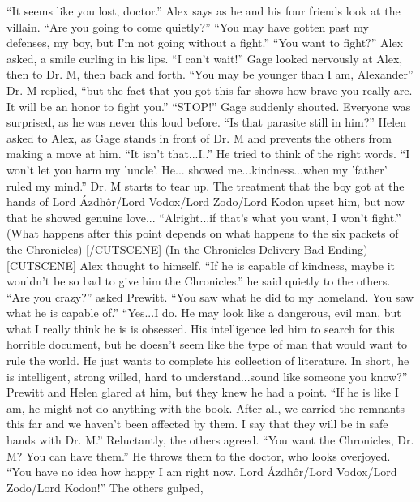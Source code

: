\documentclass{gd-document}
\begin{document}
\begin{enumerate}
\begin{enumerate}
      [CUTSCENE] “It seems like you lost, doctor.” Alex says as he and
      his four friends look at the villain. “Are you going to come
      quietly?” “You may have gotten past my defenses, my boy, but I'm
      not going without a fight.” “You want to fight?” Alex asked, a
      smile curling in his lips. “I can't wait!” Gage looked nervously
      at Alex, then to Dr. M, then back and forth. “You may be younger
      than I am, Alexander” Dr. M replied,  “but the fact that you got
      this far shows how brave you really are. It will be an honor to
      fight you.” “STOP!” Gage suddenly shouted. Everyone was
      surprised, as he was never this loud before. “Is that parasite
      still in him?” Helen asked to Alex, as Gage stands in front of
      Dr. M and prevents the others from making a move at him. “It
      isn't that...I..” He tried to think of the right words. “I won't
      let you harm my 'uncle'. He... showed me...kindness...when my
      'father' ruled my mind.” Dr. M starts to tear up. The treatment
      that the boy got at the hands of Lord Ázdhôr/Lord Vodox/Lord
      Zodo/Lord Kodon upset him, but now that he showed genuine
      love... “Alright...if that's what you want, I won't fight.”
      (What happens after this point depends on what happens to the
      six packets of the Chronicles) [/CUTSCENE] (In the Chronicles
      Delivery Bad Ending) [CUTSCENE] Alex thought to himself. “If he
      is capable of kindness, maybe it wouldn't be so bad to give him
      the Chronicles.” he said quietly to the others. “Are you crazy?”
      asked Prewitt. “You saw what he did to my homeland. You saw what
      he is capable of.” “Yes...I do. He may look like a dangerous,
      evil man, but what I really think he is is obsessed. His
      intelligence led him to search for this horrible document, but
      he doesn't seem like the type of man that would want to rule the
      world. He just wants to complete his collection of
      literature. In short, he is intelligent, strong willed, hard to
      understand...sound like someone you know?” Prewitt and Helen
      glared at him, but they knew he had a point. “If he is like I
      am, he might not do anything with the book. After all, we
      carried the remnants this far and we haven't been affected by
      them. I say that they will be in safe hands with Dr. M.”
      Reluctantly, the others agreed. “You want the Chronicles, Dr. M?
      You can have them.” He throws them to the doctor, who looks
      overjoyed. “You have no idea how happy I am right now. Lord
      Ázdhôr/Lord Vodox/Lord Zodo/Lord Kodon!” The others gulped,

\end{enumerate}
\end{enumerate}
\end{document}
